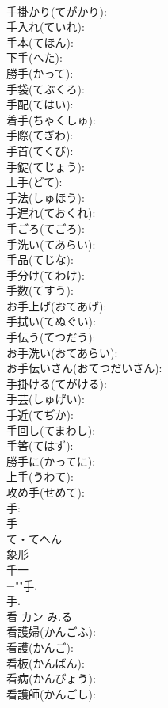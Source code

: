 \documentclass[8pt]{extreport}
\begin{document}
\begin{CJK}{UTF8}{min}
\\	手掛かり(てがかり): 
\\	手入れ(ていれ): 
\\	手本(てほん): 
\\	下手(へた): 
\\	勝手(かって): 
\\	手袋(てぶくろ): 
\\	手配(てはい): 
\\	着手(ちゃくしゅ): 
\\	手際(てぎわ): 
\\	手首(てくび): 
\\	手錠(てじょう): 
\\	土手(どて): 
\\	手法(しゅほう): 
\\	手遅れ(ておくれ): 
\\	手ごろ(てごろ): 
\\	手洗い(てあらい): 
\\	手品(てじな): 
\\	手分け(てわけ): 
\\	手数(てすう): 
\\	お手上げ(おてあげ): 
\\	手拭い(てぬぐい): 
\\	手伝う(てつだう): 
\\	お手洗い(おてあらい): 
\\	お手伝いさん(おてつだいさん): 
\\	手掛ける(てがける): 
\\	手芸(しゅげい): 
\\	手近(てぢか): 
\\	手回し(てまわし): 
\\	手筈(てはず): 
\\	勝手に(かってに): 
\\	上手(うわて): 
\\	攻め手(せめて): 
\\	手: 
\\	手	
\\	て・てへん	
\\	象形 
\\	千一
\\	=""手.
\\	手.
\\	看	カン	み.る		
\\	看護婦(かんごふ): 
\\	看護(かんご): 
\\	看板(かんばん): 
\\	看病(かんびょう): 
\\	看護師(かんごし): 

\end{CJK}
\end{document}
